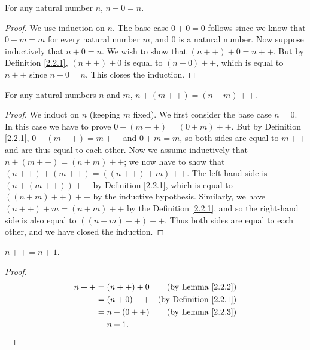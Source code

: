 \begin{lemma}\label{2.2.2}
    For any natural number \(n\), \(n + 0 = n\).
\end{lemma}

\begin{proof}
    We use induction on \(n\).
    The base case \(0 + 0 = 0\) follows since we know that \(0 + m = m\) for every natural number \(m\), and \(0\) is a natural number.
    Now suppose inductively that \(n + 0 = n\).
    We wish to show that \((n++) + 0 = n++\).
    But by Definition \ref{2.2.1}, \((n++) + 0\) is equal to \((n + 0)++\), which is equal to \(n++\) since \(n + 0 = n\).
    This closes the induction.
\end{proof}

\begin{lemma}\label{2.2.3}
    For any natural numbers \(n\) and \(m\), \(n + (m++) = (n + m)++\).
\end{lemma}

\begin{proof}
    We induct on \(n\) (keeping \(m\) fixed).
    We first consider the base case \(n = 0\).
    In this case we have to prove \(0 + (m++) = (0 + m)++\).
    But by Definition \ref{2.2.1}, \(0 + (m++) = m++\) and \(0 + m = m\), so both sides are equal to \(m++\) and are thus equal to each other.
    Now we assume inductively that \(n + (m++) = (n + m)++\);
    we now have to show that \((n++) + (m++) = ((n++) + m)++\).
    The left-hand side is \((n + (m++))++\) by Definition \ref{2.2.1}, which is equal to \(((n+m)++)++\) by the inductive hypothesis.
    Similarly, we have \((n++) + m = (n + m)++\) by the Definition \ref{2.2.1}, and so the right-hand side is also equal to \(((n + m)++)++\).
    Thus both sides are equal to each other, and we have closed the induction.
\end{proof}

\begin{additional corollary}\label{ac 2.2.2}
\(n++ = n + 1\).
\end{additional corollary}

\begin{proof}
    \begin{align*}
        n++ & = (n++) + 0 & \text{(by Lemma \ref{2.2.2})}      \\
            & = (n + 0)++ & \text{(by Definition \ref{2.2.1})} \\
            & = n + (0++) & \text{(by Lemma \ref{2.2.3})}      \\
            & = n + 1.
    \end{align*}
\end{proof}


